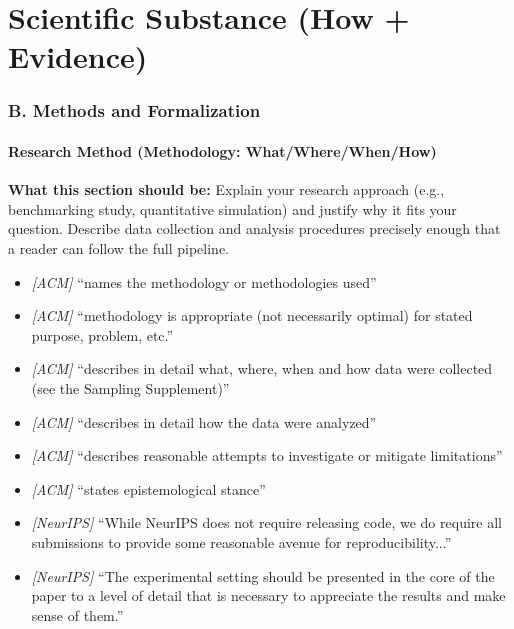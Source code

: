 \documentclass[11pt]{article}
\begin{document}
\part{Scientific Substance (How + Evidence)}

\section*{B. Methods and Formalization}

\subsection{Research Method (Methodology: What/Where/When/How)}
\noindent\textbf{What this section should be:}
Explain your research approach (e.g., benchmarking study, quantitative simulation) and justify why it fits your question. Describe data collection and analysis procedures precisely enough that a reader can follow the full pipeline.
\begin{itemize}
  \item \textit{[ACM]} ``names the methodology or methodologies used''
  \item \textit{[ACM]} ``methodology is appropriate (not necessarily optimal) for stated purpose, problem, etc.''
  \item \textit{[ACM]} ``describes in detail what, where, when and how data were collected (see the Sampling Supplement)''
  \item \textit{[ACM]} ``describes in detail how the data were analyzed''
  \item \textit{[ACM]} ``describes reasonable attempts to investigate or mitigate limitations''
  \item \textit{[ACM]} ``states epistemological stance''
  \item \textit{[NeurIPS]} ``While NeurIPS does not require releasing code, we do require all submissions to provide some reasonable avenue for reproducibility...''
  \item \textit{[NeurIPS]} ``The experimental setting should be presented in the core of the paper to a level of detail that is necessary to appreciate the results and make sense of them.''
\end{itemize}
\end{document}
